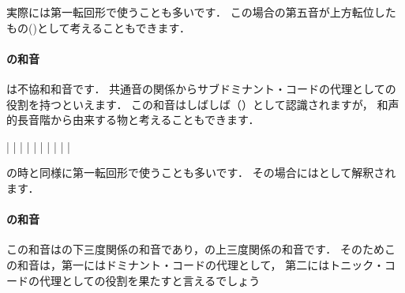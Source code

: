 \documentclass[dvipdfmx,uplatex,b5paper,openany,jbase=12Q,nomag*,textwidth-limit=44%
               ]{gachimuchi}[2020/05/05]
\begin{document}
実際には第一転回形で使うことも多いです．
この場合の第五音が上方転位したもの()として考えることもできます．
\paragraph{\Gnii\Dimt の和音}
\Gnii\Dimt は不協和和音です．
共通音の関係からサブドミナント・コードの代理としての役割を持つといえます．
この和音はしばしば（）として認識されますが，
和声的長音階から由来する物と考えることもできます．

\begin{floatMusic}[pos=ht]
  \Startpiece%
  \znotes|\en
  \NOTes
  |%
  \en\bar
  \NOTEs
  |%
  \en\doublebar
  \NOTEs
  |%
  \en\bar
  \NOTEs
  |%
  \en\doublebar
  \NOTes
  |%
  \en\bar
  \NOTes
  \Mryaku\sk%
  |%
  \Mryaku\sk
  \en\setdoublebar
  \endpiece%
\end{floatMusic}

\Gnii\Min の時と同様に第一転回形で使うことも多いです．
その場合にはとして解釈されます．

\paragraph{\Gniii\Min の和音}
この和音は\Gnv の下三度関係の和音であり，\Gni の上三度関係の和音です．
そのためこの和音は，第一にはドミナント・コードの代理として，
第二にはトニック・コードの代理としての役割を果たすと言えるでしょう
\end{document}
